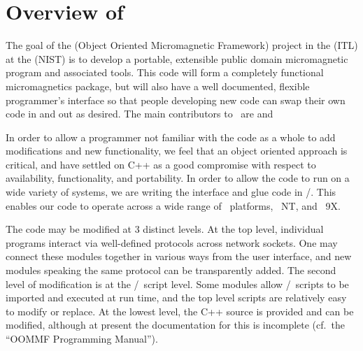 \section{Overview of \OOMMF}\label{sec:overview}
The goal of the
 (Object
Oriented Micromagnetic Framework) project in the
 (ITL) at the
 (NIST)
is to develop a portable, extensible public domain micromagnetic
program and associated tools.  This code will form a completely
functional micromagnetics package, but will also have a well
documented, flexible programmer's interface so that people developing
new code can swap their own code in and out as desired.  The main
contributors to \OOMMF\ are
and

In order to allow a programmer not familiar with the code as a whole
to add modifications and new functionality, we feel that an object
oriented approach is critical, and have settled on C++ as a good
compromise with respect to availability, functionality, and
portability.  In order to allow the code to run on a wide variety of
systems, we are writing the interface and glue code in \Tcl/\Tk.  This
enables our code to operate across a wide range of \Unix\ platforms,
\Windows~NT, and \Windows~9X.

The code may be modified at 3 distinct levels.  At the top level,
individual programs interact via well-defined protocols across network
sockets.  One may connect these modules together
in various ways from the user interface, and new modules speaking the
same protocol can be transparently added.  The second level of
modification is at the \Tcl/\Tk\ script level.  Some modules allow
\Tcl/\Tk\ scripts to be imported and executed at run time, and the top
level scripts are relatively easy to modify or replace.  At the lowest
level, the C++ source is provided and can be modified, although at
present the documentation for this is incomplete (cf.\ the ``OOMMF
Programming Manual'').

